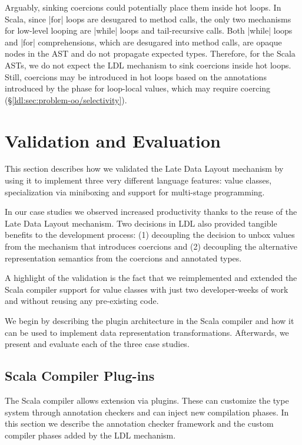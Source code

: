 Arguably, sinking coercions could potentially place them inside hot loops. In Scala, since |for| loops are desugared to method calls, the only two mechanisms for low-level looping are |while| loops and tail-recursive calls. Both |while| loops and |for| comprehensions, which are desugared into method calls, are opaque nodes in the AST and do not propagate expected types. Therefore, for the Scala ASTs, we do not expect the LDL mechanism to sink coercions inside hot loops. Still, coercions may be introduced in hot loops based on the annotations introduced by the \inject{} phase for loop-local values, which may require coercing (\S\ref{ldl:sec:problem-oo/selectivity}).

\section{Validation and Evaluation}
\label{ldl:sec:validation}

This section describes how we validated the Late Data Layout mechanism by using it to implement three very different language features: value classes, specialization via miniboxing and support for multi-stage programming.

In our case studies we observed increased productivity thanks to the reuse of the Late Data Layout mechanism. Two decisions in LDL also provided tangible benefits to the development process: (1) decoupling the decision to unbox values from the mechanism that introduces coercions and (2) decoupling the alternative representation semantics from the coercions and annotated types.

A highlight of the validation is the fact that we reimplemented and extended the Scala compiler support for value classes \cite{sip-value-classes} with just two developer-weeks of work and without reusing any pre-existing code.

We begin by describing the plugin architecture in the Scala compiler and how it can be used to implement data representation transformations. Afterwards, we present and evaluate each of the three case studies.

\subsection{Scala Compiler Plug-ins}
\label{ldl:sec:validation/plugins}
The Scala compiler allows extension via plugins. These can customize the type system through annotation checkers and can inject new compilation phases. In this section we describe the annotation checker framework and the custom compiler phases added by the LDL mechanism.

